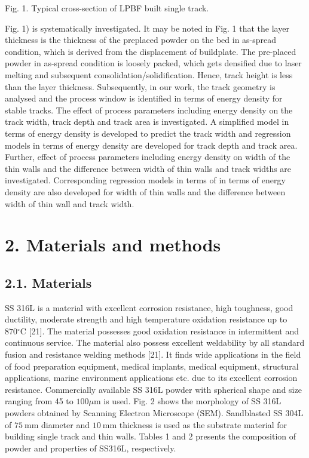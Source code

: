 \documentclass[10pt]{article}
\begin{document}
Fig. 1. Typical cross-section of LPBF built single track.

Fig. 1) is systematically investigated. It may be noted in Fig. 1 that the layer thickness is the thickness of the preplaced powder on the bed in as-spread condition, which is derived from the displacement of buildplate. The pre-placed powder in as-spread condition is loosely packed, which gets densified due to laser melting and subsequent consolidation/solidification. Hence, track height is less than the layer thickness. Subsequently, in our work, the track geometry is analysed and the process window is identified in terms of energy density for stable tracks. The effect of process parameters including energy density on the track width, track depth and track area is investigated. A simplified model in terms of energy density is developed to predict the track width and regression models in terms of energy density are developed for track depth and track area. Further, effect of process parameters including energy density on width of the thin walls and the difference between width of thin walls and track widths are investigated. Corresponding regression models in terms of in terms of energy density are also developed for width of thin walls and the difference between width of thin wall and track width.

\section*{2. Materials and methods}
\subsection*{2.1. Materials}
SS 316L is a material with excellent corrosion resistance, high toughness, good ductility, moderate strength and high temperature oxidation resistance up to $870{ }^{\circ} \mathrm{C}$ [21]. The material possesses good oxidation resistance in intermittent and continuous service. The material also possess excellent weldability by all standard fusion and resistance welding methods [21]. It finds wide applications in the field of food preparation equipment, medical implants, medical equipment, structural applications, marine environment applications etc. due to its excellent corrosion resistance. Commercially available SS 316L powder with spherical shape and size ranging from 45 to $100 \mu \mathrm{m}$ is used. Fig. 2 shows the morphology of SS 316L powders obtained by Scanning Electron Microscope (SEM). Sandblasted SS 304L of $75 \mathrm{~mm}$ diameter and $10 \mathrm{~mm}$ thickness is used as the substrate material for building single track and thin walls. Tables 1 and 2 presents the composition of powder and properties of SS316L, respectively.
\end{document}
